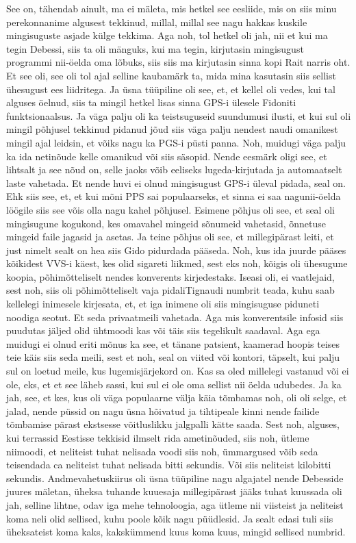 See on, tähendab ainult, ma ei mäleta, mis hetkel see eesliide, mis on siis minu perekonnanime algusest tekkinud, millal, millal see nagu hakkas kuskile mingisuguste asjade külge tekkima. Aga noh, tol hetkel oli jah, nii et kui ma tegin Debessi, siis ta oli mänguks, kui ma tegin, kirjutasin mingisugust programmi nii-öelda oma lõbuks, siis siis ma kirjutasin sinna kopi Rait narris oht. Et see oli, see oli tol ajal selline kaubamärk ta, mida mina kasutasin siis sellist ühesugust ees liidritega. Ja üsna tüüpiline oli see, et, et kellel oli vedes, kui tal alguses öelnud, siis ta mingil hetkel lisas sinna GPS-i ülesele Fidoniti funktsionaalsus. Ja väga palju oli ka teistsuguseid suundumusi ilusti, et kui sul oli mingil põhjusel tekkinud pidanud jõud siis väga palju nendest naudi omanikest mingil ajal leidsin, et võiks nagu ka PGS-i püsti panna. Noh, muidugi väga palju ka ida netinõude kelle omanikud või siis säsopid. Nende eesmärk oligi see, et lihtsalt ja see nõud on, selle jaoks võib eeliseks lugeda-kirjutada ja automaatselt laste vahetada. Et nende huvi ei olnud mingisugust GPS-i üleval pidada, seal on.
Ehk siis see, et, et kui mõni PPS sai populaarseks, et sinna ei saa nagunii-öelda löögile siis see võis olla nagu kahel põhjusel. Esimene põhjus oli see, et seal oli mingisugune kogukond, kes omavahel mingeid sõnumeid vahetasid, õnnetuse mingeid faile jagasid ja asetas. Ja teine põhjus oli see, et millegipärast leiti, et just nimelt sealt on hea siis Gido pidurdada pääseda.
Noh, kus ida juurde pääses kõikidest VVS-i käest, kes olid sigareti liikmed, sest eks noh, kõigis oli ühesugune koopia, põhimõtteliselt nendes konverents kirjedestaks. Iseasi oli, ei vaatlejaid, sest noh, siis oli põhimõtteliselt vaja pidaliTignaudi numbrit teada, kuhu saab kellelegi inimesele kirjesata, et, et iga inimene oli siis mingisuguse piduneti noodiga seotut. Et seda privaatmeili vahetada. Aga mis konverentsile infosid siis puudutas jäljed olid ühtmoodi kas või täis siis tegelikult saadaval.
Aga ega muidugi ei olnud eriti mõnus ka see, et tänane patsient, kaamerad hoopis teises teie käis siis seda meili, sest et noh, seal on viited või kontori, täpselt, kui palju sul on loetud meile, kus lugemisjärjekord on. Kas sa oled millelegi vastanud või ei ole, eks, et et see läheb sassi, kui sul ei ole oma sellist nii öelda udubedes. Ja ka jah, see, et kes, kus oli väga populaarne välja käia tõmbamas noh, oli oli selge, et jalad, nende püssid on nagu üsna hõivatud ja tihtipeale kinni nende failide tõmbamise pärast ekstsesse võitluslikku jalgpalli kätte saada. Sest noh, alguses, kui terrassid Eestisse tekkisid ilmselt rida ametinõuded, siis noh, ütleme niimoodi, et neliteist tuhat nelisada voodi siis noh, ümmargused võib seda teisendada ca neliteist tuhat nelisada bitti sekundis. Või siis neliteist kilobitti sekundis. Andmevahetuskiirus oli üsna tüüpiline nagu algajatel nende Debesside juures mäletan, üheksa tuhande kuuesaja millegipärast jääks tuhat kuussada oli jah, selline lihtne, odav iga mehe tehnoloogia, aga ütleme nii viisteist ja neliteist koma neli olid sellised, kuhu poole kõik nagu püüdlesid. Ja sealt edasi tuli siis üheksateist koma kaks, kakskümmend kuus koma kuus, mingid sellised numbrid.
